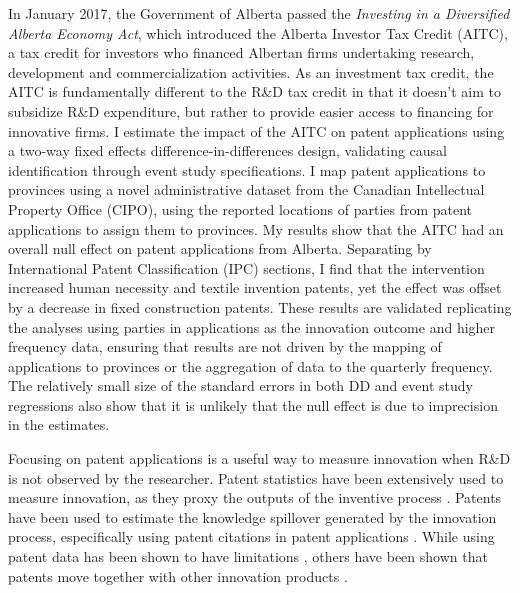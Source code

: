 \documentclass[../main.tex]{subfiles}
\begin{document}
In January 2017, the Government of Alberta passed the \textit{Investing in a Diversified Alberta Economy Act}, which introduced the Alberta Investor Tax Credit (AITC), a tax credit for investors who financed Albertan firms undertaking research, development and commercialization activities. As an investment tax credit, the AITC is fundamentally different to the R\&D tax credit in that it doesn't aim to subsidize R\&D expenditure, but rather to provide easier access to financing for innovative firms. I estimate the impact of the AITC on patent applications using a two-way fixed effects difference-in-differences design, validating causal identification through event study specifications. I map patent applications to provinces using a novel administrative dataset from the Canadian Intellectual Property Office (CIPO), using the reported locations of parties from patent applications to assign them to provinces. My results show that the AITC had an overall null effect on patent applications from Alberta. Separating by International Patent Classification (IPC) sections, I find that the intervention increased human necessity and textile invention patents, yet the effect was offset by a decrease in fixed construction patents. These results are validated replicating the analyses using parties in applications as the innovation outcome and higher frequency data, ensuring that results are not driven by the mapping of applications to provinces or the aggregation of data to the quarterly frequency. The relatively small size of the standard errors in both DD and event study regressions also show that it is unlikely that the null effect is due to imprecision in the estimates.

Focusing on patent applications is a useful way to measure innovation when R\&D is not observed by the researcher. Patent statistics have been extensively used to measure innovation, as they proxy the outputs of the inventive process \parencite{nordhaus69, pavitt85,trajtenberg90,artz_etal10}. Patents have been used to estimate the knowledge spillover generated by the innovation process, especifically using patent citations in patent applications \parencite{trajtenberg90,jaffe_etal93}. While using patent data has been shown to have limitations \parencite{lanjouw_etal98a}, others have been shown that patents move together with other innovation products \parencite{lanjouw_schankerman04}.
\end{document}
